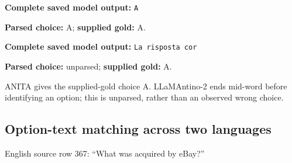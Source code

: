 \begin{tcolorbox}[enhanced,colback=black!2,colframe=black!25,boxrule=0.4pt,arc=1pt,left=7pt,right=6pt,top=4pt,bottom=4pt,title={ANITA; Italian},fonttitle=\sffamily\small,coltitle=black,colbacktitle=black!8,before upper={\raggedright\setlength{\parindent}{0pt}}]
\textbf{Complete saved model output:} \texttt{A}
\par\smallskip\textbf{Parsed choice:} A; \textbf{supplied gold:} A.
\end{tcolorbox}

\begin{tcolorbox}[enhanced,colback=black!2,colframe=black!25,boxrule=0.4pt,arc=1pt,left=7pt,right=6pt,top=4pt,bottom=4pt,title={LLaMAntino-2; Italian},fonttitle=\sffamily\small,coltitle=black,colbacktitle=black!8,before upper={\raggedright\setlength{\parindent}{0pt}}]
\textbf{Complete saved model output:} \texttt{\textvisiblespace{}La risposta cor}
\par\smallskip\textbf{Parsed choice:} unparsed; \textbf{supplied gold:} A.
\end{tcolorbox}

ANITA gives the supplied-gold choice A. LLaMAntino-2 ends mid-word before identifying an option; this is unparsed, rather than an observed wrong choice.

\clearpage

\subsection*{Option-text matching across two languages}

English source row 367: ``What was acquired by eBay?''

